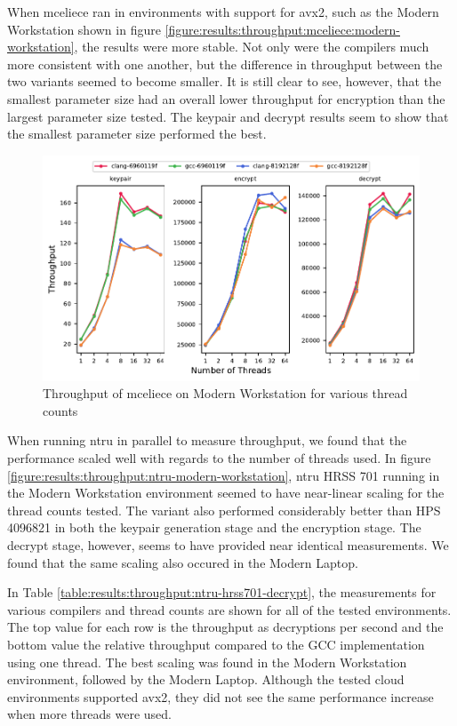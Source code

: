 When \gls{mceliece} ran in environments with support for \gls{avx2}, such as the Modern Workstation shown in figure \ref{figure:results:throughput:mceliece:modern-workstation}, the results were more stable. Not only were the compilers much more consistent with one another, but the difference in throughput between the two variants seemed to become smaller. It is still clear to see, however, that the smallest parameter size had an overall lower throughput for encryption than the largest parameter size tested. The keypair and decrypt results seem to show that the smallest parameter size performed the best.

\begin{figure}
    \centering
    \includegraphics[scale=0.75]{chapters/results/throughput/Modern Workstation_mceliece.pdf}
    \caption{Throughput of \gls{mceliece} on Modern Workstation for various thread counts}
    \label{figure:results:throughput:mceliece-modern-workstation}
\end{figure}

When running \gls{ntru} in parallel to measure throughput, we found that the performance scaled well with regards to the number of threads used. In figure \ref{figure:results:throughput:ntru-modern-workstation}, \gls{ntru} HRSS 701 running in the Modern Workstation environment seemed to have near-linear scaling for the thread counts tested. The variant also performed considerably better than HPS 4096821 in both the keypair generation stage and the encryption stage. The decrypt stage, however, seems to have provided near identical measurements. We found that the same scaling also occured in the Modern Laptop.

In Table \ref{table:results:throughput:ntru-hrss701-decrypt}, the measurements for various compilers and thread counts are shown for all of the tested environments. The top value for each row is the throughput as decryptions per second and the bottom value the relative throughput compared to the GCC implementation using one thread. The best scaling was found in the Modern Workstation environment, followed by the Modern Laptop. Although the tested cloud environments supported \gls{avx2}, they did not see the same performance increase when more threads were used. %

